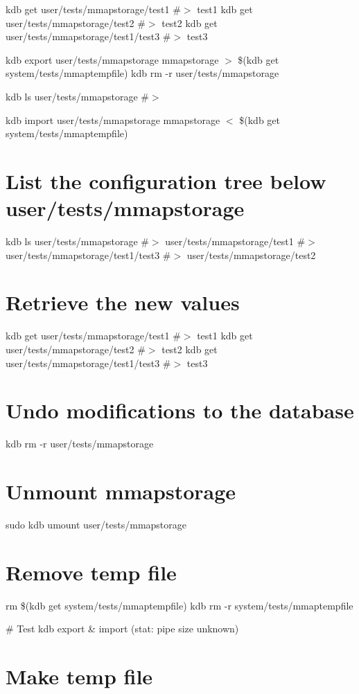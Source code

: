 kdb get user/tests/mmapstorage/test1 \#$>$ test1 kdb get user/tests/mmapstorage/test2 \#$>$ test2 kdb get user/tests/mmapstorage/test1/test3 \#$>$ test3

kdb export user/tests/mmapstorage mmapstorage $>$ \$(kdb get system/tests/mmaptempfile) kdb rm -\/r user/tests/mmapstorage

kdb ls user/tests/mmapstorage \#$>$

kdb import user/tests/mmapstorage mmapstorage $<$ \$(kdb get system/tests/mmaptempfile)

\section*{List the configuration tree below {\ttfamily user/tests/mmapstorage}}

kdb ls user/tests/mmapstorage \#$>$ user/tests/mmapstorage/test1 \#$>$ user/tests/mmapstorage/test1/test3 \#$>$ user/tests/mmapstorage/test2

\section*{Retrieve the new values}

kdb get user/tests/mmapstorage/test1 \#$>$ test1 kdb get user/tests/mmapstorage/test2 \#$>$ test2 kdb get user/tests/mmapstorage/test1/test3 \#$>$ test3

\section*{Undo modifications to the database}

kdb rm -\/r user/tests/mmapstorage

\section*{Unmount mmapstorage}

sudo kdb umount user/tests/mmapstorage

\section*{Remove temp file}

rm \$(kdb get system/tests/mmaptempfile) kdb rm -\/r system/tests/mmaptempfile 
\begin{DoxyCode}
# Test kdb export & import (stat: pipe size unknown)
\end{DoxyCode}
 \section*{Make temp file}

